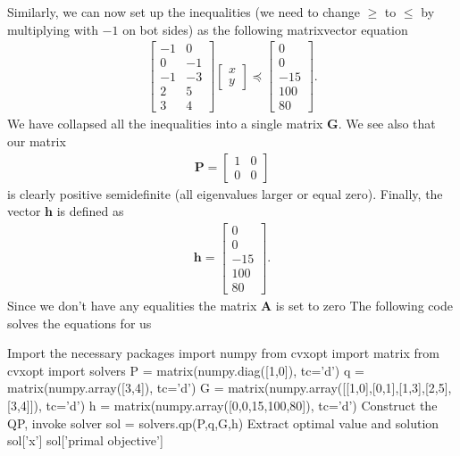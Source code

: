 \documentclass[letterpaper,10pt,english]{sphinxmanual}
\begin{document}
Similarly, we can now set up the inequalities (we need to change \(\geq\) to \(\leq\) by multiplying with \(-1\) on bot sides) as the following matrix\sphinxhyphen{}vector equation
\begin{equation*}
\begin{split}
\begin{bmatrix} -1 & 0 \\ 0 & -1 \\ -1 & -3 \\ 2 & 5 \\ 3 & 4\end{bmatrix}\begin{bmatrix} x \\ y\end{bmatrix} \preceq \begin{bmatrix}0 \\ 0\\ -15 \\ 100 \\ 80\end{bmatrix}.
\end{split}
\end{equation*}
We have collapsed all the inequalities into a single matrix \(\boldsymbol{G}\). We see also that our matrix
\begin{equation*}
\begin{split}
\boldsymbol{P} =\begin{bmatrix} 1 & 0\\ 0 & 0  \end{bmatrix}
\end{split}
\end{equation*}
is clearly positive semi\sphinxhyphen{}definite (all eigenvalues larger or equal zero).
Finally, the vector \(\boldsymbol{h}\) is defined as
\begin{equation*}
\begin{split}
\boldsymbol{h} = \begin{bmatrix}0 \\ 0\\ -15 \\ 100 \\ 80\end{bmatrix}.
\end{split}
\end{equation*}
Since we don’t have any equalities the matrix \(\boldsymbol{A}\) is set to zero
The following code solves the equations for us

\begin{sphinxVerbatim}[commandchars=\\\{\}]
\PYGZsh{} Import the necessary packages
import numpy
from cvxopt import matrix
from cvxopt import solvers
P = matrix(numpy.diag([1,0]), tc=’d’)
q = matrix(numpy.array([3,4]), tc=’d’)
G = matrix(numpy.array([[\PYGZhy{}1,0],[0,\PYGZhy{}1],[\PYGZhy{}1,\PYGZhy{}3],[2,5],[3,4]]), tc=’d’)
h = matrix(numpy.array([0,0,\PYGZhy{}15,100,80]), tc=’d’)
\PYGZsh{} Construct the QP, invoke solver
sol = solvers.qp(P,q,G,h)
\PYGZsh{} Extract optimal value and solution
sol[’x’] 
sol[’primal objective’]
\end{sphinxVerbatim}
\end{document}
